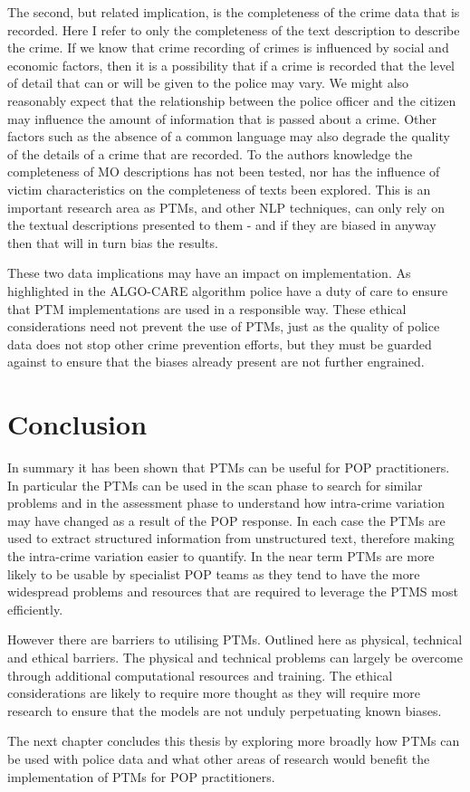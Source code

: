 The second, but related implication, is the completeness of the crime data that is recorded. Here I refer to only the completeness of the text description to describe the crime. If we know that crime recording of crimes is influenced by social and economic factors, then it is a possibility that if a crime is recorded that the level of detail that can or will be given to the police may vary. We might also reasonably expect that the relationship between the police officer and the citizen may influence the amount of information that is passed about a crime. Other factors such as the absence of a common language may also degrade the quality of the details of a crime that are recorded. To the authors knowledge the completeness of MO descriptions has not been tested, nor has the influence of victim characteristics on the completeness of texts been explored. This is an important research area as PTMs, and other NLP techniques, can only rely on the textual descriptions presented to them - and if they are biased in anyway then that will in turn bias the results.

These two data implications may have an impact on implementation. As highlighted in the ALGO-CARE algorithm police have a duty of care to ensure that PTM implementations are used in a responsible way. These ethical considerations need not prevent the use of PTMs, just as the quality of police data does not stop other crime prevention efforts,  but they must be guarded against to ensure that the biases already present are not further engrained.  

\section{Conclusion} In summary it has been shown that PTMs can be useful for POP practitioners. In particular the PTMs can be used in the scan phase to search for similar problems and in the assessment phase to understand how intra-crime variation may have changed as a result of the POP response. In each case the PTMs are used to extract structured information from unstructured text, therefore making the intra-crime variation easier to quantify. In the near term PTMs are more likely to be usable by specialist POP teams as they tend to have the more widespread problems and resources that are required to leverage the PTMS most efficiently. 

However there are barriers to utilising PTMs. Outlined here as physical, technical and ethical barriers. The physical and technical problems can largely be overcome through additional computational resources and training. The ethical considerations are likely to require more thought as they will require more research to ensure that the models are not unduly perpetuating known biases. 

The next chapter concludes this thesis by exploring more broadly how PTMs can be used with police data and what other areas of research would benefit the implementation of PTMs for POP practitioners. 

